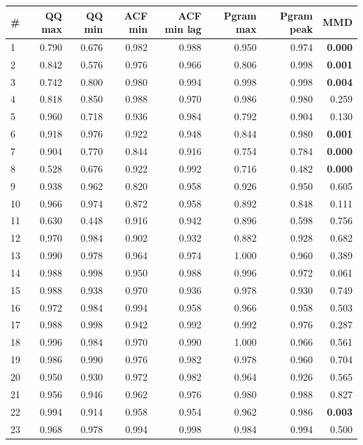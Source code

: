 \documentclass[11pt,a4paper]{article}
\begin{document}
\begin{center}
\begin{tabular}{lrrrrrrr}
\toprule
\# & QQ max & QQ min & ACF min & ACF min lag & Pgram max & Pgram peak & MMD \\
\midrule
1 & 0.790 & 0.676 & 0.982 & 0.988 & 0.950 & 0.974 & \textbf{0.000} \\
2 & 0.842 & 0.576 & 0.976 & 0.966 & 0.806 & 0.998 & \textbf{0.001} \\
3 & 0.742 & 0.800 & 0.980 & 0.994 & 0.998 & 0.998 & \textbf{0.004} \\
4 & 0.818 & 0.850 & 0.988 & 0.970 & 0.986 & 0.980 & 0.259 \\
5 & 0.960 & 0.718 & 0.936 & 0.984 & 0.792 & 0.904 & 0.130 \\
6 & 0.918 & 0.976 & 0.922 & 0.948 & 0.844 & 0.980 & \textbf{0.001} \\
7 & 0.904 & 0.770 & 0.844 & 0.916 & 0.754 & 0.784 & \textbf{0.000} \\
8 & 0.528 & 0.676 & 0.922 & 0.992 & 0.716 & 0.482 & \textbf{0.000} \\
9 & 0.938 & 0.962 & 0.820 & 0.958 & 0.926 & 0.950 & 0.605 \\
10 & 0.966 & 0.974 & 0.872 & 0.958 & 0.892 & 0.848 & 0.111 \\
11 & 0.630 & 0.448 & 0.916 & 0.942 & 0.896 & 0.598 & 0.756 \\
12 & 0.970 & 0.984 & 0.902 & 0.932 & 0.882 & 0.928 & 0.682 \\
13 & 0.990 & 0.978 & 0.964 & 0.974 & 1.000 & 0.960 & 0.389 \\
14 & 0.988 & 0.998 & 0.950 & 0.988 & 0.996 & 0.972 & 0.061 \\
15 & 0.988 & 0.938 & 0.970 & 0.936 & 0.978 & 0.930 & 0.749 \\
16 & 0.972 & 0.984 & 0.994 & 0.958 & 0.966 & 0.958 & 0.503 \\
17 & 0.988 & 0.998 & 0.942 & 0.992 & 0.992 & 0.976 & 0.287 \\
18 & 0.996 & 0.984 & 0.970 & 0.990 & 1.000 & 0.966 & 0.561 \\
19 & 0.986 & 0.990 & 0.976 & 0.982 & 0.978 & 0.960 & 0.704 \\
20 & 0.950 & 0.930 & 0.972 & 0.982 & 0.964 & 0.926 & 0.565 \\
21 & 0.956 & 0.946 & 0.962 & 0.976 & 0.980 & 0.988 & 0.827 \\
22 & 0.994 & 0.914 & 0.958 & 0.954 & 0.962 & 0.986 & \textbf{0.003} \\
23 & 0.968 & 0.978 & 0.994 & 0.998 & 0.984 & 0.994 & 0.500 \\

\end{tabular}
\end{center}
\end{document}
